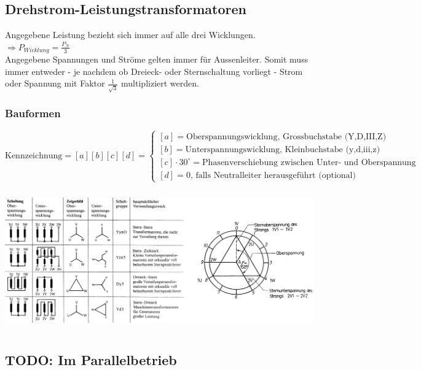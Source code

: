 	\subsection{Drehstrom-Leistungstransformatoren} 
	Angegebene Leistung bezieht sich immer auf alle drei Wicklungen. $\Rightarrow P_{Wicklung} =
	\frac{P_N}{3}$ \\
	Angegebene Spannungen und Str\"ome gelten immer für Aussenleiter. Somit muss immer entweder - je
 nachdem ob Dreieck- oder Sternschaltung vorliegt -	Strom oder Spannung mit Faktor
 $\frac{1}{\sqrt{3}}$ multipliziert werden.
 	\subsubsection{Bauformen}
	 $$\text{Kennzeichnung} = [a][b][c][d] = \begin{cases}
                  [a] = \text{Oberspannungswicklung, Grossbuchstabe (Y,D,III,Z)
                  }\\
                  [b] = \text{Unterspannungswicklung, Kleinbuchstabe (y,d,iii,z) } \\
                  [c] \cdot 30^\circ = \text{Phasenverschiebung zwischen Unter- und Oberspannung }
                  \\ [d] = 0 \text{, falls Neutralleiter herausgeführt (optional)}
                  \end{cases}$$
		\begin{center}
	    	\includegraphics[height=6cm]{bilder/Drehstromtrafo.png}
	    \end{center} 
	    
\subsection{TODO: Im Parallelbetrieb}

	    

